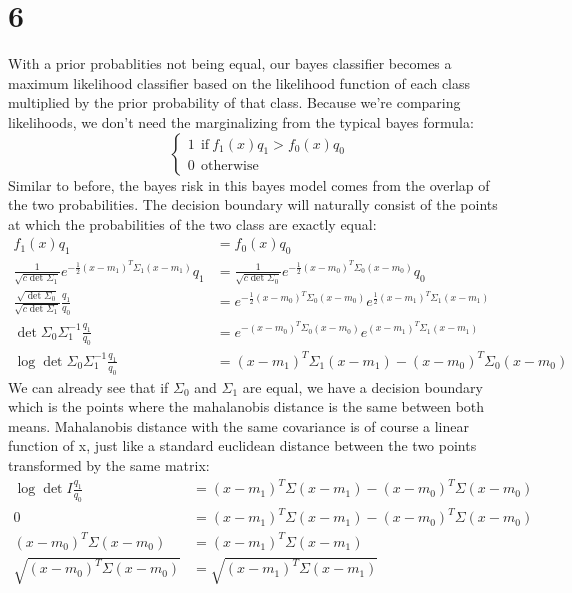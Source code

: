 \documentclass[a4paper,12pt]{article}
\begin{document}
\section*{6}
With a prior probablities not being equal, our bayes classifier becomes a maximum likelihood classifier based on the likelihood function of each class multiplied by the prior probability of that class. Because we're comparing likelihoods, we don't need the marginalizing from the typical bayes formula:
%
$$
\begin{cases}
  1 \ \ \text{if} \ f_1(x)q_1 > f_0(x)q_0 \\
  0 \ \ \text{otherwise}
\end{cases}
$$
%
Similar to before, the bayes risk in this bayes model comes from the overlap of the two probabilities. The decision boundary will naturally consist of the points at which the probabilities of the two class are exactly equal:
%
\begin{align*}
f_1(x)q_1 &= f_0(x)q_0 \\
\frac{1}{ \sqrt{ c\det\Sigma_1} } e^{ -\frac{1}{2}(x - m_1)^T\Sigma_1(x - m_1) }q_1 &= \frac{1}{ \sqrt{ c\det\Sigma_0} } e^{ -\frac{1}{2}(x - m_0)^T\Sigma_0(x - m_0) }q_0 \\
\frac{\sqrt{ \det\Sigma_0}}{ \sqrt{ c\det\Sigma_1} }\frac{q_1}{q_0} &= e^{ -\frac{1}{2}(x - m_0)^T\Sigma_0(x - m_0) } e^{ \frac{1}{2}(x - m_1)^T\Sigma_1(x - m_1) } \\
\det \Sigma_0\Sigma_1^{-1}\frac{q_1}{q_0}  &= e^{ -(x - m_0)^T\Sigma_0(x - m_0) } e^{ (x - m_1)^T\Sigma_1(x - m_1) } \\
\log \det  \Sigma_0\Sigma_1^{-1}\frac{q_1}{q_0}  &= (x - m_1)^T\Sigma_1(x - m_1)  - (x - m_0)^T\Sigma_0(x - m_0)
\end{align*}
%
We can already see that if $\Sigma_0$ and $\Sigma_1$ are equal, we have a decision boundary which is the points where the mahalanobis distance is the same between both means. Mahalanobis distance with the same covariance is of course a linear function of x, just like a standard euclidean distance between the two points transformed by the same matrix:
%
\begin{align*}
\log \det I \frac{q_1}{q_0}  &= (x - m_1)^T\Sigma(x - m_1)  - (x - m_0)^T\Sigma(x - m_0) \\
0  &= (x - m_1)^T\Sigma(x - m_1)  - (x - m_0)^T\Sigma(x - m_0) \\
(x - m_0)^T\Sigma(x - m_0)  &= (x - m_1)^T\Sigma(x - m_1)  \\
\sqrt{(x - m_0)^T\Sigma(x - m_0)}  &= \sqrt{(x - m_1)^T\Sigma(x - m_1)}
\end{align*}
\end{document}
